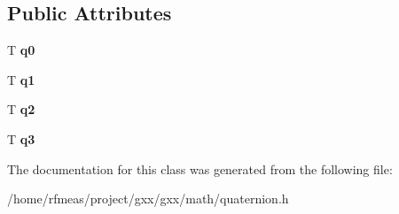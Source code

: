 \subsection*{Public Attributes}
\begin{DoxyCompactItemize}
\item 
T {\bfseries q0}\hypertarget{classmalgo_1_1quaternion_acc1d88a72d47b816149f1b54ab8c4889}{}\label{classmalgo_1_1quaternion_acc1d88a72d47b816149f1b54ab8c4889}

\item 
T {\bfseries q1}\hypertarget{classmalgo_1_1quaternion_abe1e014de94a7ad1f8e243a9a76b1c0c}{}\label{classmalgo_1_1quaternion_abe1e014de94a7ad1f8e243a9a76b1c0c}

\item 
T {\bfseries q2}\hypertarget{classmalgo_1_1quaternion_acef115adeeac535a3d1884e3d2604c0a}{}\label{classmalgo_1_1quaternion_acef115adeeac535a3d1884e3d2604c0a}

\item 
T {\bfseries q3}\hypertarget{classmalgo_1_1quaternion_adda1c6bcae1e35dcbac62e4bb93adfdf}{}\label{classmalgo_1_1quaternion_adda1c6bcae1e35dcbac62e4bb93adfdf}

\end{DoxyCompactItemize}


The documentation for this class was generated from the following file\+:\begin{DoxyCompactItemize}
\item 
/home/rfmeas/project/gxx/gxx/math/quaternion.\+h\end{DoxyCompactItemize}
